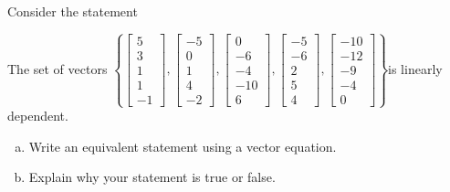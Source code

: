 
\begin{exerciseStatement}


Consider the statement 
\begin{center}\begin{minipage}{0.8\textwidth}
 The set of vectors \( \left\{ \left[\begin{array}{c}
5 \\
3 \\
1 \\
1 \\
-1
\end{array}\right] , \left[\begin{array}{c}
-5 \\
0 \\
1 \\
4 \\
-2
\end{array}\right] , \left[\begin{array}{c}
0 \\
-6 \\
-4 \\
-10 \\
6
\end{array}\right] , \left[\begin{array}{c}
-5 \\
-6 \\
2 \\
5 \\
4
\end{array}\right] , \left[\begin{array}{c}
-10 \\
-12 \\
-9 \\
-4 \\
0
\end{array}\right] \right\} \)is linearly dependent.
\end{minipage}\end{center}
    


\begin{enumerate}[(a)]
\item  Write an equivalent statement using a vector equation.
\item  Explain why your statement is true or false.
\end{enumerate}
    
\end{exerciseStatement}
    
